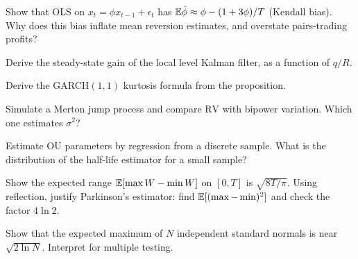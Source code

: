 \begin{exercises}
\item Show that OLS on $x_t=\phi x_{t-1}+\epsilon_t$ has $\mathbb{E}\hat\phi\approx\phi-(1+3\phi)/T$ (Kendall bias). Why does this bias inflate mean reversion estimates, and overstate pairs-trading profits?
\item Derive the steady-state gain of the local level Kalman filter, as a function of $q/R$.
\item Derive the GARCH$(1,1)$ kurtosis formula from the proposition.
\item Simulate a Merton jump process and compare $\mathrm{RV}$ with bipower variation. Which one estimates $\sigma^2$?
\item Estimate OU parameters by regression from a discrete sample. What is the distribution of the half-life estimator for a small sample?
\item Show the expected range $\mathbb{E}[\max W-\min W]$ on $[0,T]$ is $\sqrt{8T/\pi}$. Using reflection, justify Parkinson's estimator: find $\mathbb{E}[(\max-\min)^2]$ and check the factor $4\ln2$.
\item Show that the expected maximum of $N$ independent standard normals is near $\sqrt{2\ln N}$. Interpret for multiple testing.
\end{exercises}
